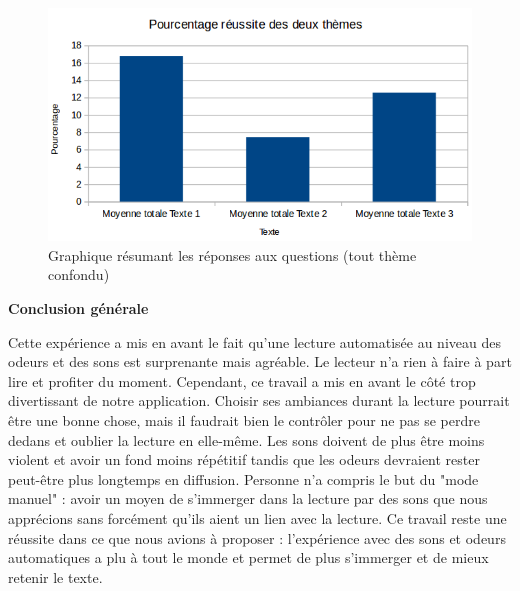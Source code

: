 \documentclass[a4paper,14pt]{report}
\begin{document}
\begin{figure}[!h]
\begin{center}

\includegraphics[scale=0.5]{../Images/ResultatsGlobal.png}
\caption{Graphique résumant les réponses aux questions (tout thème confondu)}
\end{center}



\end{figure}



\pagebreak

\begin{center}
\textbf{Conclusion générale}
\end{center}


Cette expérience a mis en avant le fait qu'une lecture automatisée au niveau des odeurs et des sons est surprenante mais agréable. Le lecteur n'a rien à faire à part lire et profiter du moment. Cependant, ce travail a mis en avant le côté trop divertissant de notre application. Choisir ses ambiances durant la lecture pourrait être une bonne chose, mais il faudrait bien le contrôler pour ne pas se perdre dedans et oublier la lecture en elle-même. Les sons doivent de plus être moins violent et avoir un fond moins répétitif tandis que les odeurs devraient rester peut-être plus longtemps en diffusion. Personne n'a compris le but du "mode manuel" : avoir un moyen de s'immerger dans la lecture par des sons que nous apprécions sans forcément qu'ils aient un lien avec la lecture.
Ce travail reste une réussite dans ce que nous avions à proposer : l'expérience avec des sons et odeurs automatiques a plu à tout le monde et permet de plus s'immerger et de mieux retenir le texte.
\end{document}
